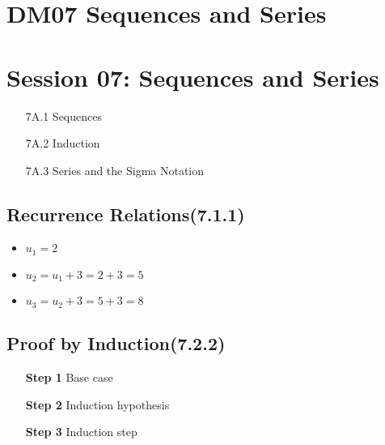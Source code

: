 \documentclass{article}
\begin{document}
\section*{DM07 Sequences and Series}

\section*{Session 07: Sequences and Series}
\begin{itemize}
\item[7A.1] Sequences
\item[7A.2] Induction
\item[7A.3] Series and the Sigma Notation
\end{itemize}

\subsection*{Recurrence Relations(7.1.1)}

\begin{itemize}
\item $u_1 = 2$
\item $u_2 = u_1 + 3 = 2 +3 = 5$
\item $u_3 = u_2 + 3 = 5+ 3 = 8$
\end{itemize}


\subsection*{Proof by Induction(7.2.2)}
\begin{itemize}
\item[\textbf{Step 1}] Base case
\item[\textbf{Step 2}] Induction hypothesis
\item[\textbf{Step 3}] Induction step
\end{itemize}
\end{document}
